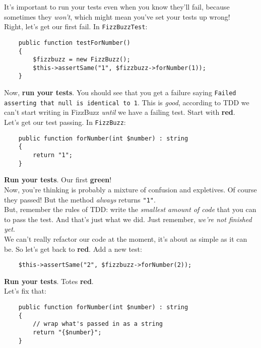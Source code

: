 It's important to run your tests even when you know they'll fail, because sometimes they \textit{won't}, which might mean you've set your tests up wrong!
\\

Right, let's get our first fail. In \texttt{FizzBuzzTest}:

\begin{verbatim}
    public function testForNumber()
    {
        $fizzbuzz = new FizzBuzz();
        $this->assertSame("1", $fizzbuzz->forNumber(1));
    }
\end{verbatim}

Now, \textbf{run your tests}. You should see that you get a failure saying \texttt{Failed asserting that null is identical to \textquotesingle{}1\textquotesingle{}}. This is \textit{good}, according to TDD we can't start writing in FizzBuzz \textit{until} we have a failing test. Start with \textbf{red}.
\\

Let's get our test passing. In \texttt{FizzBuzz}:

\begin{verbatim}
    public function forNumber(int $number) : string
    {
        return "1";
    }
\end{verbatim}

\textbf{Run your tests}. Our first \textbf{green}!
\\

Now, you're thinking is probably a mixture of confusion and expletives. Of course they passed! But the method \textit{always} returns \texttt{"1"}.
\\

But, remember the rules of TDD: write the \textit{smallest amount of code} that you can to pass the test. And that's just what we did. Just remember, \textit{we're not finished yet}.
\\

We can't really refactor our code at the moment, it's about as simple as it can be. So let's get back to \textbf{red}. Add a new test:

\begin{verbatim}
    $this->assertSame("2", $fizzbuzz->forNumber(2));
\end{verbatim}

\textbf{Run your tests}. Totes \textbf{red}.
\\

Let's fix that:

\begin{verbatim}
    public function forNumber(int $number) : string
    {
        // wrap what's passed in as a string
        return "{$number}";
    }
\end{verbatim}

